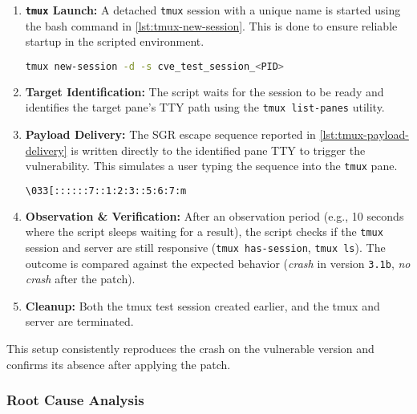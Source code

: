 \begin{enumerate}
	\item \textbf{\texttt{tmux} Launch:} A detached \texttt{tmux} session with a unique name is started using the bash command in \autoref{lst:tmux-new-session}. This is done to ensure reliable startup in the scripted environment.

	      \noindent \begin{lstlisting}[language=bash, caption=Bash to create a new detached tmux sesssion, label={lst:tmux-new-session}]
tmux new-session -d -s cve_test_session_<PID>
\end{lstlisting}

	\item \textbf{Target Identification:} The script waits for the session to be ready and identifies the target pane's TTY path using the \texttt{tmux list-panes} utility.

	\item \textbf{Payload Delivery:} The SGR escape sequence reported in \autoref{lst:tmux-payload-delivery} is written directly to the identified pane TTY to trigger the vulnerability. This simulates a user typing the sequence into the \texttt{tmux} pane.

	      \begin{lstlisting}[language=bash, caption=Payload sent to the tmux pane, label={lst:tmux-payload-delivery}]
\033[::::::7::1:2:3::5:6:7:m
\end{lstlisting}

	\item \textbf{Observation \& Verification:} After an observation period (e.g., 10 seconds where the script sleeps waiting for a result), the script checks if the \texttt{tmux} session and server are still responsive (\texttt{tmux has-session}, \texttt{tmux ls}). The outcome is compared against the expected behavior (\emph{crash} in version \texttt{3.1b}, \emph{no crash} after the patch).

	\item \textbf{Cleanup:} Both the tmux test session created earlier, and the tmux and server are terminated.
\end{enumerate}

This setup consistently reproduces the crash on the vulnerable version and confirms its absence after applying the patch.

\subsubsection{Root Cause Analysis}

